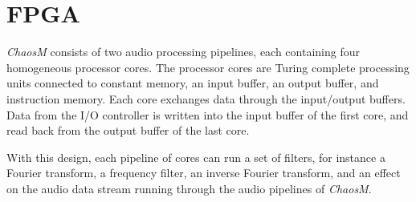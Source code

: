 
\FloatBarrier
\section{FPGA}\label{chapter:fpga}

\textit{ChaosM} consists of two audio processing pipelines, each containing four
homogeneous processor cores. The processor cores are Turing complete processing
units connected to constant memory, an input buffer, an output buffer, and
instruction memory. Each core exchanges data through the input/output buffers.
Data from the I/O controller is written into the input buffer of the first core, and read
back from the output buffer of the last core.

With this design, each pipeline of cores can run a set of filters, for instance
a Fourier transform, a frequency filter, an inverse Fourier transform, and an
effect on the audio data stream running through the audio pipelines of \textit{ChaosM}.








